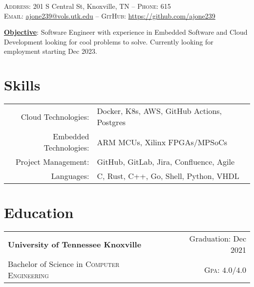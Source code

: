 \documentclass[a4paper,12pt]{article}
\begin{document}

\pagestyle{empty} %


\par{\smallskip{}
\par{\small \textsc{Address:} 201 S Central St, Knoxville, TN \---
\small \textsc{Phone:} 615\\
\textsc{Email:} \href{mailto:ajones53.aj@gmail.com}{ajone239@vols.utk.edu} \---
\textsc{GitHub:} \href{https://github.com/ajone239}{https://github.com/ajone239}
} \smallskip{}
\par{\textbf{\underline{Objective}}: Software Engineer with experience in Embedded Software and Cloud Development looking for cool problems to solve.
Currently looking for employment starting Dec 2023.
}\smallskip}{}



\section{Skills}
\begin{tabularx}{\textwidth}{rl}
   Cloud Technologies: & Docker, K8s, AWS, GitHub Actions, Postgres \\
   Embedded Technologies: & ARM MCUs, Xilinx FPGAs/MPSoCs \\
   Project Management: & GitHub, GitLab, Jira, Confluence, Agile \\
   Languages: & C, Rust, C++, Go, Shell, Python, VHDL \\
\end{tabularx}

\section{Education}
\begin{tabularx}{\textwidth}{lXr}
   \textbf{University of Tennessee Knoxville} & & Graduation: Dec 2021\\
   Bachelor of Science in \textsc{Computer Engineering} &  & \normalsize \textsc{Gpa}: $4.0/4.0$\\
\end{tabularx}
\end{document}

